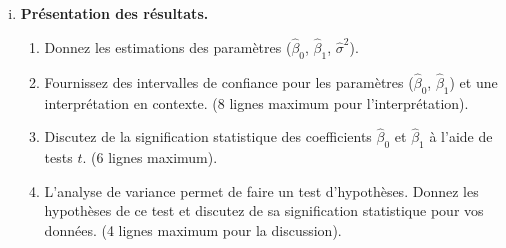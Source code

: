 \documentclass[letter, 11pt]{article}
\begin{document}
\begin{enumerate}[(i)]
\begin{enumerate}[a)]
\end{enumerate}
	\item {\bf Présentation des résultats.}
\begin{enumerate}
	\item Donnez les estimations des param\`etres (${\hat \beta}_0$, ${\hat \beta}_1$, ${\hat \sigma}^2$).
	\item Fournissez des intervalles de confiance pour les paramètres (${\hat \beta}_0$, ${\hat \beta}_1$) et une interprétation en contexte. (8 lignes maximum pour l'interprétation).
	\item Discutez de la signification statistique des coefficients ${\hat \beta}_0$ et ${\hat \beta}_1$ à l'aide de tests $t$. (6 lignes maximum).
	\item L'analyse de variance permet de faire un test d'hypothèses. Donnez les hypothèses de ce test et discutez de sa signification statistique pour vos données. (4 lignes maximum pour la discussion).
\end{enumerate}
\end{enumerate}
\end{document}
